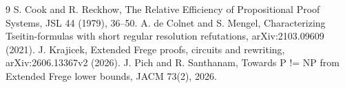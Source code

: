 \documentclass[11pt]{article}
\begin{document}
\begin{thebibliography}{9}
 S. Cook and R. Reckhow, The Relative Efficiency of Propositional Proof Systems, JSL 44 (1979), 36--50.
 A. de Colnet and S. Mengel, Characterizing Tseitin-formulas with short regular resolution refutations, arXiv:2103.09609 (2021).
 J. Krajicek, Extended Frege proofs, circuits and rewriting, arXiv:2606.13367v2 (2026).
 J. Pich and R. Santhanam, Towards P != NP from Extended Frege lower bounds, JACM 73(2), 2026.
\end{thebibliography}
\end{document}
